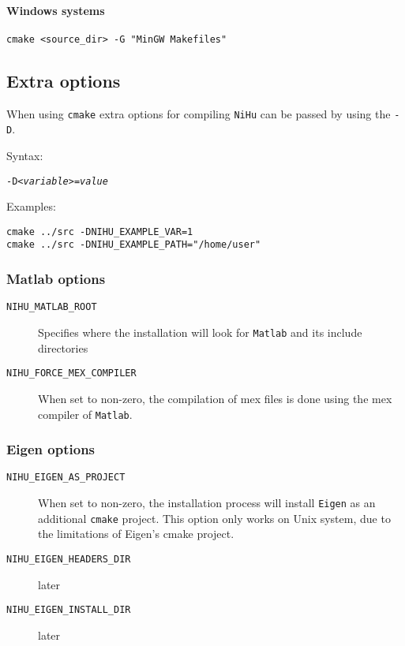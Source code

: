 \documentclass[a4paper,10pt]{article}
\begin{document}
\paragraph{Windows systems}

\begin{verbatim}
cmake <source_dir> -G "MinGW Makefiles"
\end{verbatim}


\subsection{Extra options}

When using \texttt{cmake} extra options for compiling \texttt{NiHu} can be passed by using the \texttt{-D}.

Syntax:

\texttt{-D\itshape{<variable>}=\itshape{value}}

Examples:

\begin{verbatim}
cmake ../src -DNIHU_EXAMPLE_VAR=1
cmake ../src -DNIHU_EXAMPLE_PATH="/home/user"
\end{verbatim}

\subsubsection{Matlab options}

\begin{description}
	\item [\texttt{NIHU\_MATLAB\_ROOT}] Specifies where the installation will look for \texttt{Matlab} and its include directories
	\item [\texttt{NIHU\_FORCE\_MEX\_COMPILER}] When set to non-zero, the compilation of mex files is done using the mex compiler of \texttt{Matlab}.
\end{description}

\subsubsection{Eigen options}

\begin{description}
	\item [\texttt{NIHU\_EIGEN\_AS\_PROJECT}] When set to non-zero, the installation process will install \texttt{Eigen} as an additional \texttt{cmake} project. This option only works on Unix system, due to the limitations of Eigen's cmake project.

	\item [\texttt{NIHU\_EIGEN\_HEADERS\_DIR}] later
	\item [\texttt{NIHU\_EIGEN\_INSTALL\_DIR}] later
\end{description}
\end{document}
